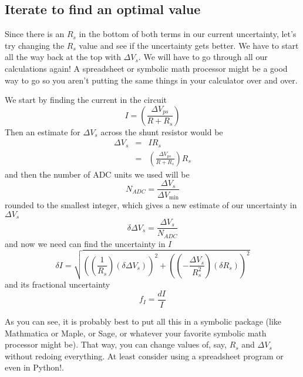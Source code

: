 \subsection{Iterate to find an optimal value}

Since there is an $R_{s}$ in the bottom of both terms in our current
uncertainty, let's try changing the $R_{s}$ value and see if the uncertainty
gets better. We have to start all the way back at the top with $\Delta
V_{s}. $ We will have to go through all our calculations again! A
spreadsheet or symbolic math processor might be a good way to go so you
aren't putting the same things in your calculator over and over.

We start by finding the current in the circuit
\begin{equation*}
I=\left( \frac{\Delta V_{ps}}{R+R_{s}}\right)
\end{equation*}%
Then an estimate for $\Delta V_{s}$ across the shunt resistor would be%
\begin{eqnarray*}
\Delta V_{s} &=&IR_{s} \\
&=&\left( \frac{\Delta V_{ps}}{R+R_{s}}\right) R_{s}
\end{eqnarray*}%
and then the number of ADC units we used will be 
\begin{equation*}
N_{ADC}=\frac{\Delta V_{s}}{\Delta V_{\min }}
\end{equation*}%
rounded to the smallest integer, which gives a new estimate of our
uncertainty in $\Delta V_{s}$ 
\begin{equation*}
\delta \Delta V_{s}=\frac{\Delta V_{s}}{N_{ADC}}
\end{equation*}%
and now we need can find the uncertainty in $I$
\begin{equation*}
\delta I=\sqrt{\left( \left( \frac{1}{R_{s}}\right) \left( \delta \Delta
V_{s}\right) \right) ^{2}+\left( \left( -\frac{\Delta V_{s}}{R_{s}^{2}}%
\right) \left( \delta R_{s}\right) \right) ^{2}}
\end{equation*}%
and its fractional uncertainty%
\begin{equation*}
f_{I}=\frac{dI}{I}
\end{equation*}

As you can see, it is probably best to put all this in a symbolic package
(like Mathmatica or Maple, or Sage, or whatever your favorite symbolic math
processor might be). That way, you can change values of, say, $R_{s}$ and $%
\Delta V_{s}$ without redoing everything. At least consider using a
spreadsheet program or even in Python!.

